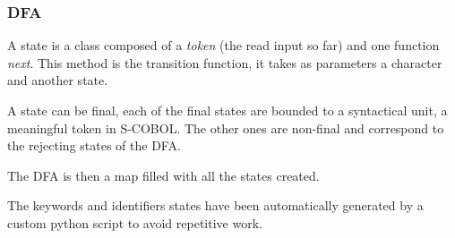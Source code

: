 \subsubsection{DFA}

A state is a class composed of a \textit{token} (the read input so far) and one function \textit{next}. This method is the transition function, it takes as parameters a character and another state.

A state can be final, each of the final states are bounded to a syntactical unit, a meaningful token in S-COBOL. The other ones are non-final and correspond to the rejecting states of the DFA.

The DFA is then a map filled with all the states created.

The keywords and identifiers states have been automatically generated by a custom python script to avoid repetitive work.

